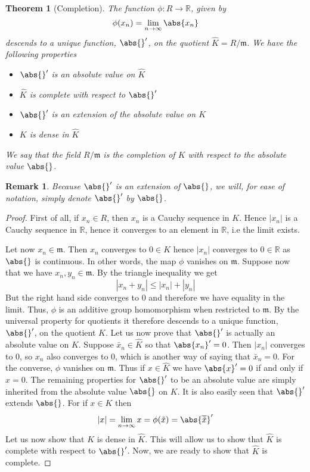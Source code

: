 \documentclass{article}
\newtheorem{theorem}{Theorem}[section]
\newtheorem{remark}{Remark}[section]
\newcommand{\mfrak}[1]{\mathfrak{#1}}
\newcommand{\mbb}[1]{\mathbb{#1}}
\begin{document}
\begin{theorem}[Completion]
    The function $\phi : R \to \mbb R$, given by
    $$\phi (x_n) = \lim_{n \to \infty} \abs{x_n}$$
    descends to a unique function, $\abs{}'$, on the quotient $\hat K = R / \mfrak m$. We have the following properties
    \begin{itemize}
        \item $\abs{}'$ is an absolute value on $\hat K$
        \item $\hat K$ is complete with respect to $\abs{}'$
        \item $\abs {}'$ is an extension of the absolute value on $K$
        \item $K$ is dense in $\hat K$
    \end{itemize}
    We say that the field $R / \mfrak m$ is the completion of $K$ with respect to the absolute value $\abs{}$.
\end{theorem}
\begin{remark}
    Because $\abs{}'$ is an extension of $\abs{}$, we will, for ease of notation, simply denote $\abs{}'$ by $\abs{}$.
\end{remark}

\begin{proof}
    First of all, if $x_n \in R$, then $x_n$ is a Cauchy sequence in $K$. Hence  $|x_n|$ is a Cauchy sequence in $\mbb R$, hence it converges to an element in $\mbb R$, i.e the limit exists.

    Let now $x_n \in \mfrak m$. Then $x_n$ converges to $0 \in K$ hence $|x_n|$ converges to $0 \in \mbb R$ as $\abs{}$ is continuous. In other words, the map $\phi$ vanishes on $\mfrak m$. Suppose now that we have $x_n, y_n \in \mfrak m$. By the triangle inequality we get 
    $$|x_n + y_n| \leq |x_n| + |y_n|$$
    But the right hand side converges to 0 and therefore we have equality in the limit. Thus, $\phi$ is an additive group homomorphism when restricted to $\mfrak m$. By the universal property for quotients it therefore descends to a unique function, $\abs{}'$, on the quotient $\hat K$. Let us now prove that $\abs{}'$ is actually an absolute value on $K$. Suppose $\bar x_n \in \hat K$ so that $\abs{x_n}' = 0$. Then $|x_n|$ converges to 0, so $x_n$ also converges to 0, which is another way of saying that $\bar x_n = 0$. For the converse, $\phi$ vanishes on $\mfrak m$. Thus if $x \in \hat K$ we have $\abs{x}' = 0$ if and only if $x = 0$. The remaining properties for $\abs{}'$ to be an absolute value are simply inherited from the absolute value $\abs{}$ on $K$. It is also easily seen that $\abs{}'$ extends $\abs{}$. For if $x \in K$ then 
    $$|x| = \lim_{n \to \infty} x = \phi(\tilde x) = \abs{\overline{ \tilde {x}}}'$$
    Let us now show that $K$ is dense in $\hat K$. This will allow us to show that $\hat K$ is complete with respect to $\abs{}'$. 
    Now, we are ready to show that $\hat K$ is complete. 
\end{proof}
\end{document}
